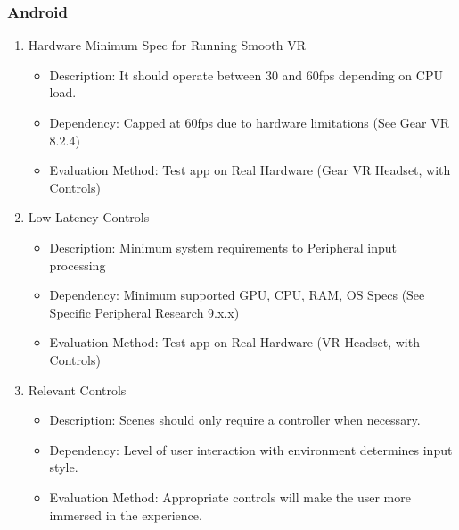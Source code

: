 \documentclass[a4paper,10pt,twoside]{article}
\begin{document}
	\subsubsection{Android}
		\begin{enumerate}
			\item Hardware Minimum Spec for Running Smooth VR
			\begin{itemize}
				\item Description: It should operate between 30 and 60fps depending on CPU load.
				\item Dependency: Capped at 60fps due to hardware limitations (See Gear VR 8.2.4)
				\item Evaluation Method: Test app on Real Hardware (Gear VR Headset, with Controls)
			\end{itemize}
			\item Low Latency Controls
			\begin{itemize}
				\item Description: Minimum system requirements to Peripheral input processing
				\item Dependency: Minimum supported GPU, CPU, RAM, OS Specs (See Specific Peripheral Research 9.x.x) 
				\item Evaluation Method: Test app on Real Hardware (VR Headset, with Controls)
			\end{itemize}
			\item Relevant Controls
			\begin{itemize}
				\item Description: Scenes should only require a controller when necessary.
				\item Dependency: Level of user interaction with environment determines input style.
				\item Evaluation Method: Appropriate controls will make the user more immersed in the experience.
			\end{itemize}
		\end{enumerate}
	
\end{document}

